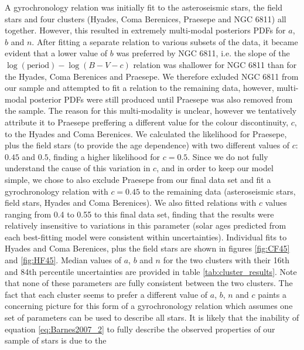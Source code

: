 \documentclass[useAMS, usenatbib]{mn2e}
\begin{document}
A gyrochronology relation was initially fit to the asteroseismic stars, the
field stars and four clusters (Hyades, Coma Berenices, Praesepe and NGC 6811)
all together.
However, this resulted in extremely multi-modal posteriors PDFs for
$a$, $b$ and $n$.
After fitting a separate relation to various subsets of the data, it became
evident that a lower value of $b$ was preferred by NGC 6811,
i.e. the slope of the $\log(\mathrm{period})-\log(B-V-c)$ relation was
shallower for NGC 6811 than for the Hyades, Coma Berenices and Praesepe.
We therefore exluded NGC 6811 from our sample and attempted to fit
a relation to the remaining data, however, multi-modal posterior PDFs were
still produced until Praesepe was also removed from the sample.
The reason for this multi-modality is unclear, however we tentatively attribute
it to Praesepe preffering a different value for the colour discontinuity, $c$,
to the Hyades and Coma Berenices.  %
We calculated the likelihood for Praesepe, plus the field stars (to provide
the age dependence) with two different values of $c$: $0.45$ and $0.5$,
finding a higher likelihood for $c=0.5$.
Since we do not fully understand the cause of this variation in $c$, and in
order to keep our model simple, we chose to also exclude Praesepe from
our final data set and fit a gyrochronology relation with $c=0.45$ to the
remaining data (asteroseismic stars, field stars, Hyades and Coma Berenices).
We also fitted relations with $c$ values ranging from 0.4 to 0.55 to this final
data set, finding that the results were relatively insensitive to variations
in this parameter (solar ages predicted from each best-fitting model were
consistent within uncertainties).
Individual fits to Hyades and Coma Berenices, plus the field stars are shown
in figures \ref{fig:CF45} and \ref{fig:HF45}.
Median values of $a$, $b$ and $n$ for the two clusters with their 16th and 84th
percentile uncertainties are provided in table
\ref{tab:cluster_results}.
Note that none of these parameters are fully consistent between the two
clusters.
The fact that each cluster seems to prefer a different value of $a$, $b$, $n$
and $c$ paints a concerning picture for this form of a gyrochronology relation
which assumes one set of parameters can be used to describe all stars.
It is likely that the inability of equation \ref{eq:Barnes2007_2} to fully
describe the observed properties of our sample of stars is due to the
\end{document}

